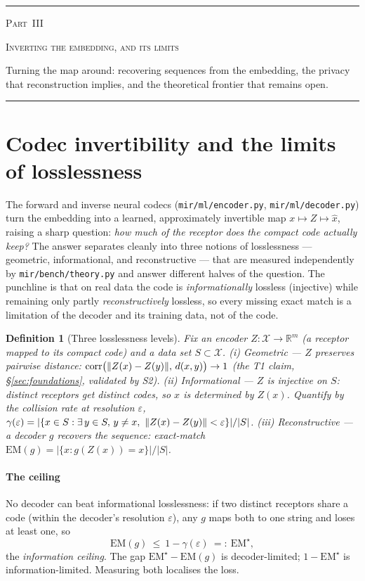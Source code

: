 \documentclass[11pt]{article}
\theoremstyle{oldplain}
\theoremstyle{oldrem}
\newtheorem{definition}{Definition}
\newcommand{\R}{\mathds{R}}  %
\newcommand{\code}[1]{\texttt{#1}}
\DeclarePairedDelimiter{\norm}{\lVert}{\rVert}
\newcommand{\apppart}[3]{%
  \par\addvspace{2.4em}%
  {\centering
    {\color{cGray}\rule{0.45\linewidth}{0.4pt}}\par\vspace{0.7em}%
    {\scshape\large Part~#1}\par\vspace{0.25em}%
    {\scshape\LARGE #2}\par\vspace{0.5em}%
    {\itshape\small\parbox{0.78\linewidth}{\centering #3}\par}\vspace{0.65em}%
    {\color{cGray}\rule{0.45\linewidth}{0.4pt}}\par
  }%
  \addvspace{1.8em}\par\nobreak
}
\begin{document}
\apppart{III}{Inverting the embedding, and its limits}{Turning the map around: recovering sequences from the
embedding, the privacy that reconstruction implies, and the theoretical frontier that remains open.}

\section{Codec invertibility and the limits of losslessness}\label{sec:losslessness}

The forward and inverse neural codecs (\code{mir/ml/encoder.py}, \code{mir/ml/decoder.py})
turn the embedding into a learned, approximately invertible map $x\mapsto Z\mapsto \hat x$,
raising a sharp question: \emph{how much of the receptor does the compact code actually keep?}
The answer separates cleanly into three notions of losslessness --- geometric, informational,
and reconstructive --- that are measured independently by \code{mir/bench/theory.py} and answer
different halves of the question. The punchline is that on real data the code is
\emph{informationally} lossless (injective) while remaining only partly \emph{reconstructively}
lossless, so every missing exact match is a limitation of the decoder and its training data, not
of the code.

\begin{definition}[Three losslessness levels]\label{def:loss}
Fix an encoder $Z\colon\mathcal X\to\R^m$ (a receptor mapped to its compact code) and a data set
$S\subset\mathcal X$.
\emph{(i) Geometric} --- $Z$ preserves pairwise distance:
$\mathrm{corr}\bigl(\norm{Z(x)-Z(y)},\,d(x,y)\bigr)\to 1$ (the T1 claim,
\S\ref{sec:foundations}, validated by S2).
\emph{(ii) Informational} --- $Z$ is injective on $S$: distinct receptors get distinct codes, so
$x$ is \emph{determined} by $Z(x)$. Quantify by the collision rate at resolution $\varepsilon$,
$\gamma(\varepsilon)=\lvert\{x\in S:\exists\,y\in S,\,y\neq x,\ \norm{Z(x)-Z(y)}<\varepsilon\}\rvert/\lvert S\rvert$.
\emph{(iii) Reconstructive} --- a decoder $g$ recovers the sequence:
exact-match $\mathrm{EM}(g)=\lvert\{x:g(Z(x))=x\}\rvert/\lvert S\rvert$.
\end{definition}

\paragraph{The ceiling} No decoder can beat informational losslessness: if two distinct
receptors share a code (within the decoder's resolution $\varepsilon$), any $g$ maps both to one
string and loses at least one, so
\begin{equation}
  \mathrm{EM}(g)\ \le\ 1-\gamma(\varepsilon)\ =:\ \mathrm{EM}^\star ,
  \label{eq:ceiling}
\end{equation}
the \emph{information ceiling}. The gap $\mathrm{EM}^\star-\mathrm{EM}(g)$ is decoder-limited;
$1-\mathrm{EM}^\star$ is information-limited. Measuring both localises the loss.
\end{document}
